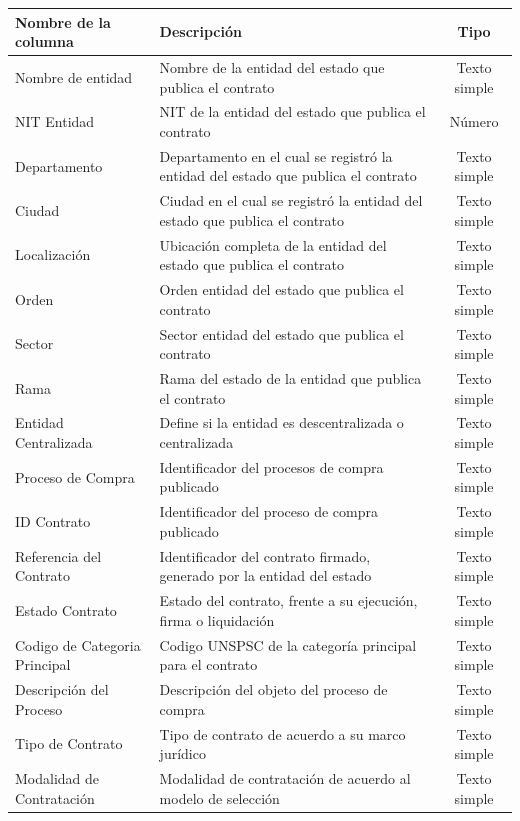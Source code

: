 \documentclass[11pt,letterpaper,oneside]{article}
\begin{document}
	\begin{table}[!htp]
	\tiny 
	\centering
	\begin{tabular}{|p{3cm}|p{6.5cm}|c|}
		\hline
		\textbf{Nombre de la columna} & \textbf{Descripción} & \textbf{Tipo} \\
		\hline
		Nombre de entidad& Nombre de la entidad del estado que publica el contrato & Texto simple \\
		\hline
		NIT Entidad & NIT de la entidad del estado que publica el contrato & Número \\
		\hline
		Departamento & Departamento en el cual se registró la entidad del estado que publica el contrato & Texto simple \\
		\hline
		Ciudad & Ciudad en el cual se registró la entidad del estado que publica el contrato & Texto simple \\
		\hline
		Localización & Ubicación completa de la entidad del estado que publica el contrato & Texto simple \\
		\hline
		Orden & Orden entidad del estado que publica el contrato & Texto simple \\
		\hline
		Sector & Sector entidad del estado que publica el contrato & Texto simple \\
		\hline
		Rama & Rama del estado de la entidad que publica el contrato & Texto simple \\
		\hline
		Entidad Centralizada & Define si la entidad es descentralizada o centralizada & Texto simple \\
		\hline
		Proceso de Compra & Identificador del procesos de compra publicado & Texto simple \\
		\hline
		ID Contrato & Identificador del proceso de compra publicado & Texto simple \\
		\hline
		Referencia del Contrato & Identificador del contrato firmado, generado por la entidad del estado & Texto simple \\
		\hline
		Estado Contrato & Estado del contrato, frente a su ejecución, firma o liquidación & Texto simple \\
		\hline
		Codigo de Categoria Principal & Codigo UNSPSC de la categoría principal para el contrato & Texto simple \\
		\hline
		Descripción del Proceso & Descripción del objeto del proceso de compra & Texto simple  \\
		\hline
		Tipo de Contrato & Tipo de contrato de acuerdo a su marco jurídico & Texto simple \\
		\hline
		Modalidad de Contratación & Modalidad de contratación de acuerdo al modelo de selección & Texto simple \\

\end{tabular}
\end{table}
\end{document}

